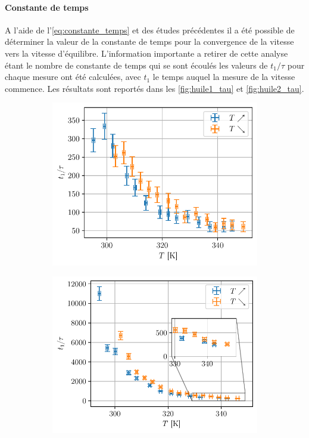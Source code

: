 \paragraph{Constante de temps} A l'aide de l'\autoref{eq:constante_temps} et des études précédentes il a été possible de déterminer la valeur de la constante de temps pour la convergence de la vitesse vers la vitesse d'équilibre. L'information importante a retirer de cette analyse étant le nombre de constante de temps qui se sont écoulés les valeurs de $t_1/\tau$ pour chaque mesure ont été calculées, avec $t_1$ le temps auquel la mesure de la vitesse commence. Les résultats sont reportés dans les \autoref{fig:huile1_tau} et \autoref{fig:huile2_tau}.
\begin{figure}[H]
    \centering
    \begin{subfigure}{0.48\linewidth}
        \centering
        \includegraphics[width=\linewidth]{figures/huile1_tau.pdf}
        \caption{}
        \label{fig:huile1_tau}
    \end{subfigure}
    \begin{subfigure}{0.48\linewidth}
        \centering
        \includegraphics[width=\linewidth]{figures/huile2_tau.pdf}

\end{subfigure}
\end{figure}
